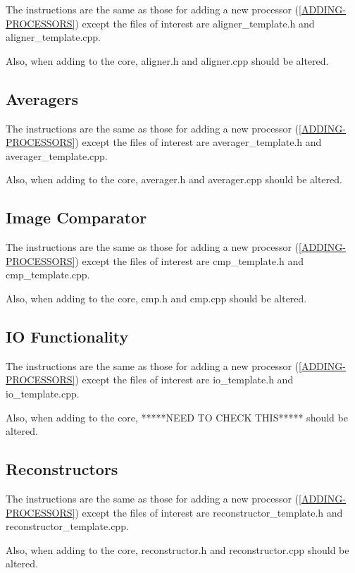   The instructions are the same as those for adding a new processor
  (\ref{ADDING-PROCESSORS}) except the files of interest are
  aligner\_template.h and aligner\_template.cpp.

  Also, when adding to the core, aligner.h and aligner.cpp should be altered.

\subsection{Averagers}
  \label{ADDING-AVERAGERS}

  The instructions are the same as those for adding a new processor
  (\ref{ADDING-PROCESSORS}) except the files of interest are
  averager\_template.h and averager\_template.cpp.

  Also, when adding to the core, averager.h and averager.cpp should be altered.

\subsection{Image Comparator}
  \label{ADDING-CMP} 

  The instructions are the same as those for adding a new processor
  (\ref{ADDING-PROCESSORS}) except the files of interest are
  cmp\_template.h and cmp\_template.cpp.

  Also, when adding to the core, cmp.h and cmp.cpp should be altered.


\subsection{IO Functionality}
  \label{ADDING-IO} 

  The instructions are the same as those for adding a new processor
  (\ref{ADDING-PROCESSORS}) except the files of interest are
  io\_template.h and io\_template.cpp.

  Also, when adding to the core, *****NEED TO CHECK THIS***** should be altered.


\subsection{Reconstructors}
  \label{ADDING-RECONSTRUCTORS} 
  
  The instructions are the same as those for adding a new processor
  (\ref{ADDING-PROCESSORS}) except the files of interest are
  reconstructor\_template.h and reconstructor\_template.cpp.

  Also, when adding to the core, reconstructor.h and reconstructor.cpp should be altered.
